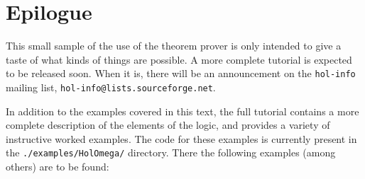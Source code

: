 
\chapter{Epilogue}
\label{chap:teaser_epilogue}

This small sample of the use of the \HOLW{} theorem prover is only intended
to give a taste of what kinds of things are possible. A more complete tutorial
is expected to be released soon.  When it is, there will be an announcement
on the \texttt{hol-info} mailing list, \texttt{hol-info@lists.sourceforge.net}.

In addition to the examples covered in this text, the full
tutorial contains a more complete description of the elements of the 
\HOLW{} logic, and provides a variety of instructive worked examples.
%
The code for these examples is currently present in the 
\texttt{./examples/HolOmega/} directory.
There the following examples (among others) are to be found:

